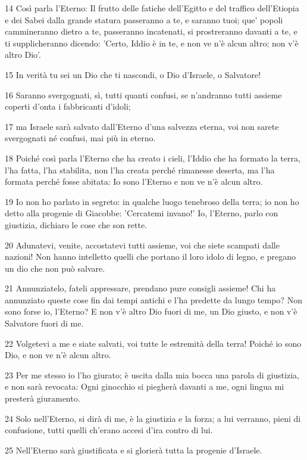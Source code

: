 \par 14 Così parla l'Eterno: Il frutto delle fatiche dell'Egitto e del traffico dell'Etiopia e dei Sabei dalla grande statura passeranno a te, e saranno tuoi; que' popoli cammineranno dietro a te, passeranno incatenati, si prostreranno davanti a te, e ti supplicheranno dicendo: 'Certo, Iddio è in te, e non ve n'è alcun altro; non v'è altro Dio'.
\par 15 In verità tu sei un Dio che ti nascondi, o Dio d'Israele, o Salvatore!
\par 16 Saranno svergognati, sì, tutti quanti confusi, se n'andranno tutti assieme coperti d'onta i fabbricanti d'idoli;
\par 17 ma Israele sarà salvato dall'Eterno d'una salvezza eterna, voi non sarete svergognati né confusi, mai più in eterno.
\par 18 Poiché così parla l'Eterno che ha creato i cieli, l'Iddio che ha formato la terra, l'ha fatta, l'ha stabilita, non l'ha creata perché rimanesse deserta, ma l'ha formata perché fosse abitata: Io sono l'Eterno e non ve n'è alcun altro.
\par 19 Io non ho parlato in segreto: in qualche luogo tenebroso della terra; io non ho detto alla progenie di Giacobbe: 'Cercatemi invano!' Io, l'Eterno, parlo con giustizia, dichiaro le cose che son rette.
\par 20 Adunatevi, venite, accostatevi tutti assieme, voi che siete scampati dalle nazioni! Non hanno intelletto quelli che portano il loro idolo di legno, e pregano un dio che non può salvare.
\par 21 Annunziatelo, fateli appressare, prendano pure consigli assieme! Chi ha annunziato queste cose fin dai tempi antichi e l'ha predette da lungo tempo? Non sono forse io, l'Eterno? E non v'è altro Dio fuori di me, un Dio giusto, e non v'è Salvatore fuori di me.
\par 22 Volgetevi a me e siate salvati, voi tutte le estremità della terra! Poiché io sono Dio, e non ve n'è alcun altro.
\par 23 Per me stesso io l'ho giurato; è uscita dalla mia bocca una parola di giustizia, e non sarà revocata: Ogni ginocchio si piegherà davanti a me, ogni lingua mi presterà giuramento.
\par 24 Solo nell'Eterno, si dirà di me, è la giustizia e la forza; a lui verranno, pieni di confusione, tutti quelli ch'erano accesi d'ira contro di lui.
\par 25 Nell'Eterno sarà giustificata e si glorierà tutta la progenie d'Israele.

